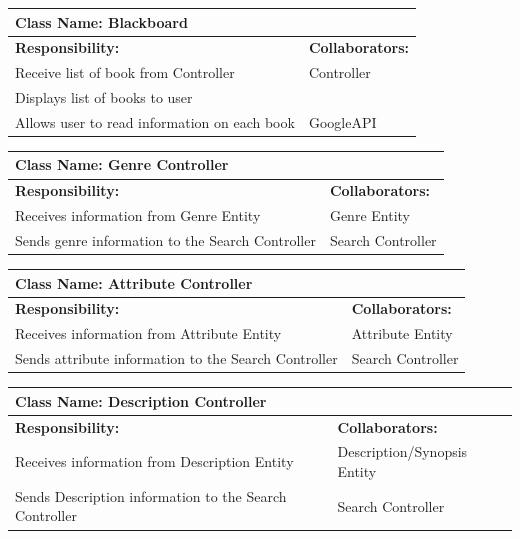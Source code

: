 \documentclass[12pt]{article}
\begin{document}
	\begin{table}[H]
		\centering
		\begin{tabular}{|p{5cm}|p{5cm}|}
		\hline 
		 \multicolumn{2}{|l|}{\textbf{Class Name: Blackboard}} \\
		\hline
		\textbf{Responsibility:} & \textbf{Collaborators:} \\
		\hline
		 Receive list of book from Controller & Controller \\
		\hline
		  Displays list of books to user &  \\
		 \hline
		 Allows user to read information on each book & GoogleAPI \\
		 \hline
		\end{tabular}
	\end{table}
	
	
	\begin{table}[H]
		\centering
		\begin{tabular}{|p{5cm}|p{5cm}|}
		\hline 
		 \multicolumn{2}{|l|}{\textbf{Class Name: Genre Controller}} \\
		\hline
		\textbf{Responsibility:} & \textbf{Collaborators:} \\
		\hline
		 Receives information from Genre Entity & Genre Entity  \\
		 \hline
		 Sends genre information to the Search Controller & Search Controller\\
		 \hline
		\end{tabular}
	\end{table}
	
	\begin{table}[H]
		\centering
		\begin{tabular}{|p{5cm}|p{5cm}|}
		\hline 
		 \multicolumn{2}{|l|}{\textbf{Class Name: Attribute Controller}} \\
		\hline
		\textbf{Responsibility:} & \textbf{Collaborators:} \\
		\hline
		 Receives information from Attribute Entity & Attribute Entity  \\
		 \hline
		 Sends attribute information to the Search Controller & Search Controller\\
		 \hline
		\end{tabular}
	\end{table}
	
	\begin{table}[H]
		\centering
		\begin{tabular}{|p{5cm}|p{5cm}|}
		\hline 
		 \multicolumn{2}{|l|}{\textbf{Class Name: Description Controller}} \\
		\hline
		\textbf{Responsibility:} & \textbf{Collaborators:} \\
		\hline
		 Receives information from Description Entity & Description/Synopsis Entity  \\
		 \hline
		 Sends Description information to the Search Controller & Search Controller\\
		 \hline
		\end{tabular}
	\end{table}
	
\end{document}
